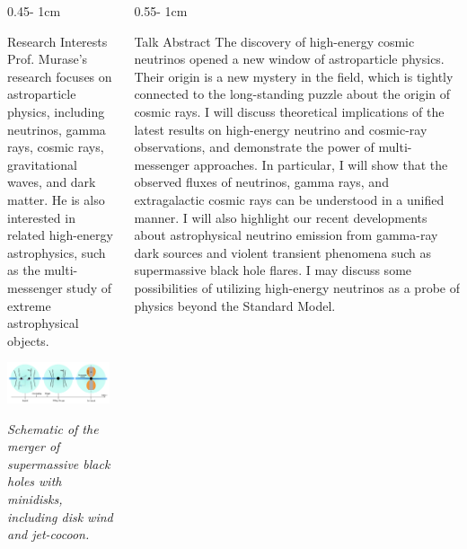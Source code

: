 \documentclass{../psuposter}
\begin{document}
\begin{frame}
\begin{columns}[t, totalwidth=\textwidth]
\begin{column}{0.45\textwidth - 1cm}
    \begin{block}{Research Interests}
        Prof. Murase's research focuses on astroparticle physics, including neutrinos, gamma rays, cosmic rays, gravitational waves, and dark matter. He is also interested in related high-energy astrophysics, such as the multi-messenger study of extreme astrophysical objects.
        \begin{center}
	    	\includegraphics[width=0.95\textwidth]{images/minidisk}    		
    	\end{center}
    	\textit{Schematic of the merger of supermassive black holes with minidisks, including disk wind and jet-cocoon.} \cite{yuanHighenergyNeutrinoEmission2020}
    \end{block}
\end{column}
\begin{column}{0.55\textwidth - 1cm}


    \begin{block}{Talk Abstract}
         The discovery of high-energy cosmic neutrinos opened a new window of astroparticle physics. Their origin is a new mystery in the field, which is tightly connected to the long-standing puzzle about the origin of cosmic rays. I will discuss theoretical implications of the latest results on high-energy neutrino and cosmic-ray observations, and demonstrate the power of multi-messenger approaches. In particular, I will show that the observed fluxes of neutrinos, gamma rays, and extragalactic cosmic rays can be understood in a unified manner. I will also highlight our recent developments about astrophysical neutrino emission from gamma-ray dark sources and violent transient phenomena such as supermassive black hole flares. I may discuss some possibilities of utilizing high-energy neutrinos as a probe of physics beyond the Standard Model.
    \end{block}



\end{column}
\end{columns}
\end{frame}
\end{document}
